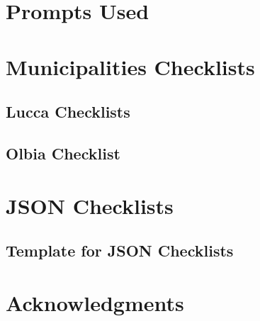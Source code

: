 \documentclass[a4paper,english,noexaminfo]{sapthesis}
\begin{document}
\appendix
\chapter{Prompts Used}
    

\chapter{Municipalities Checklists}
    \section{Lucca Checklists}
    

    \section{Olbia Checklist}
    


\chapter{JSON Checklists}
    \section{Template for JSON Checklists}
    \label{appendix:json_template}
    




%




\cleardoublepage %
\chapter*{Acknowledgments} %



%
\end{document}
